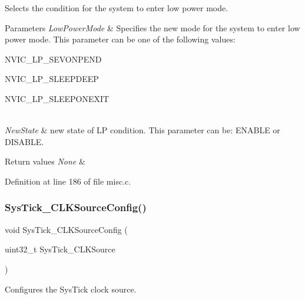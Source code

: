 Selects the condition for the system to enter low power mode. 


\begin{DoxyParams}{Parameters}
{\em Low\+Power\+Mode} & Specifies the new mode for the system to enter low power mode. This parameter can be one of the following values\+: \begin{DoxyItemize}
\item N\+V\+I\+C\+\_\+\+L\+P\+\_\+\+S\+E\+V\+O\+N\+P\+E\+ND \item N\+V\+I\+C\+\_\+\+L\+P\+\_\+\+S\+L\+E\+E\+P\+D\+E\+EP \item N\+V\+I\+C\+\_\+\+L\+P\+\_\+\+S\+L\+E\+E\+P\+O\+N\+E\+X\+IT \end{DoxyItemize}
\\
\hline
{\em New\+State} & new state of LP condition. This parameter can be\+: E\+N\+A\+B\+LE or D\+I\+S\+A\+B\+LE. \\
\hline
\end{DoxyParams}

\begin{DoxyRetVals}{Return values}
{\em None} & \\
\hline
\end{DoxyRetVals}


Definition at line 186 of file misc.\+c.

\mbox{\label{group___m_i_s_c___exported___functions_ga2777d255bb06ad62bb6372a9db1ff385}} 
\subsubsection{\texorpdfstring{Sys\+Tick\+\_\+\+C\+L\+K\+Source\+Config()}{SysTick\_CLKSourceConfig()}}
{\footnotesize\ttfamily void Sys\+Tick\+\_\+\+C\+L\+K\+Source\+Config (\begin{DoxyParamCaption}\item[{uint32\+\_\+t}]{Sys\+Tick\+\_\+\+C\+L\+K\+Source }\end{DoxyParamCaption})}



Configures the Sys\+Tick clock source. 


